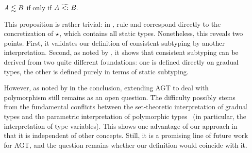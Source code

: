 \begin{mprop}
  \label{lemma:coincide-agt}
  $A \lesssim B$ if only if $A ~\widetilde{<:}~ B$.
\end{mprop}


This proposition is rather trivial:
in ,
rule  and  correspond directly to the
concretization of $\star$, which contains all static types. Nonetheless,
this reveals two points. First, it validates our definition of consistent
subtyping by another interpretation. Second, as noted by
\citet{garcia2016abstracting}, it shows that consistent subtyping can be derived
from two quite different foundations: one is defined directly on gradual types,
the other is defined purely in terms of static subtyping.

However, as noted by \citet{garcia2016abstracting} in the conclusion, extending
AGT to deal with polymorphism still remains as an open question. The difficulty
possibly stems from the fundamental conflicts between the set-theoretic
interpretation of gradual types and the parametric interpretation of
polymorphic types~\cite{reynolds1983types} (in particular, the interpretation of
type variables). This shows one advantage of our approach in that it is
independent of other concepts. Still, it is a promising line of future work for
AGT, and the question remains whether our definition would coincide with it.




